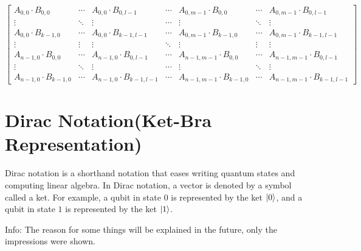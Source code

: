 \documentclass{article}
\begin{document}
\begin{equation*}
    \begin{bmatrix}
    A_{0,0} \cdot B_{0,0} & \dotsb & A_{0,0} \cdot B_{0,l-1} & \dotsb & A_{0,m-1} \cdot B_{0,0} & \dotsb & A_{0,m-1} \cdot B_{0,l-1} \\
    \vdots & \ddots & \vdots & \dotsb & \vdots & \ddots & \vdots \\
    A_{0,0} \cdot B_{k-1,0} & \dotsb & A_{0,0} \cdot B_{k-1,l-1} & \dotsb & A_{0,m-1} \cdot B_{k-1,0} & \dotsb & A_{0,m-1} \cdot B_{k-1,l-1} \\
    \vdots & \vdots & \vdots & \ddots & \vdots & \vdots & \vdots \\
    A_{n-1,0} \cdot B_{0,0} & \dotsb & A_{n-1,0} \cdot B_{0,l-1} & \dotsb & A_{n-1,m-1} \cdot B_{0,0} & \dotsb & A_{n-1,m-1} \cdot B_{0,l-1} \\
    \vdots & \ddots & \vdots & \dotsb & \vdots & \ddots & \vdots \\
    A_{n-1,0} \cdot B_{k-1,0} & \dotsb & A_{n-1,0} \cdot B_{k-1,l-1} & \dotsb & A_{n-1,m-1} \cdot B_{k-1,0} & \dotsb & A_{n-1,m-1} \cdot B_{k-1,l-1}
\end{bmatrix}
\end{equation*}
\section{Dirac Notation(Ket-Bra Representation)}
Dirac notation is a shorthand notation that eases writing quantum states and computing linear algebra. In Dirac notation, a vector is denoted by a symbol called a ket. For example, a qubit in state ${0}$ is represented by the ket $\ket{0}$, and a qubit in state ${1}$ is represented by the ket $\ket{1}$. 

\vspace{2cm}

Info: The reason for some things will be explained in the future, only the impressions were shown.
\end{document}
